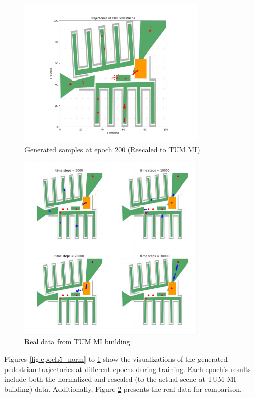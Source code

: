 \documentclass[10pt,a4paper]{article}
\begin{document}
\begin{figure}[H]
    \centering
    \includegraphics[width=0.8\textwidth]{Images/pedestrians_trajectories_epoch200.png}
    \caption{Generated samples at epoch 200 (Rescaled to TUM MI)}
    \label{fig:epoch200_real}
\end{figure}

\begin{figure}[H]
    \centering
    \includegraphics[width=0.8\textwidth]{Images/original_pedestrian_positions.png}
    \caption{Real data from TUM MI building}
    \label{fig:real_data}
\end{figure}
Figures \ref{fig:epoch5_norm} to \ref{fig:epoch200_real} show the visualizations of the generated pedestrian trajectories at different epochs during training. Each epoch's results include both the normalized and rescaled (to the actual scene at TUM MI building) data. Additionally, Figure \ref{fig:real_data} presents the real data for comparison.
\end{document}
